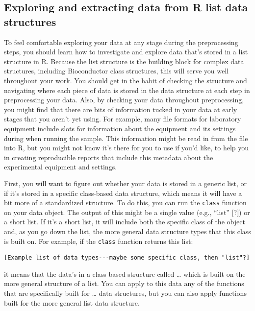 \documentclass[]{tufte-book}
\begin{document}
\hypertarget{exploring-and-extracting-data-from-r-list-data-structures}{%
\subsection{Exploring and extracting data from R list data structures}\label{exploring-and-extracting-data-from-r-list-data-structures}}

To feel comfortable exploring your data at any stage during the preprocessing
steps, you should learn how to investigate and explore data that's stored
in a list structure in R. Because the list structure is the building block
for complex data structures, including Bioconductor class structures, this will
serve you well throughout your work. You should get in the habit of checking
the structure and navigating where each piece of data is stored in the data
structure at each step in preprocessing your data. Also, by checking your data
throughout preprocessing, you might find that there are bits of information
tucked in your data at early stages that you aren't yet using. For example,
many file formats for laboratory equipment include slots for information about
the equipment and its settings during when running the sample. This information
might be read in from the file into R, but you might not know it's there for you
to use if you'd like, to help you in creating reproducible reports that include
this metadata about the experimental equipment and settings.

First, you will want to figure out whether your data is stored in a generic
list, or if it's stored in a specific class-based data structure, which means it
will have a bit more of a standardized structure. To do this, you can run the
\texttt{class} function on your data object. The output of this might be a single value
(e.g., ``list'' {[}?{]}) or a short list. If it's a short list, it will include both
the specific class of the object and, as you go down the list, the more
general data structure types that this class is built on. For example, if the
\texttt{class} function returns this list:

\begin{verbatim}
[Example list of data types---maybe some specific class, then "list"?]
\end{verbatim}

it means that the data's in a class-based structure called \ldots{} which is built on
the more general structure of a list. You can apply to this data any of the functions
that are specifically built for \ldots{} data structures, but you can also apply
functions built for the more general list data structure.
\end{document}
